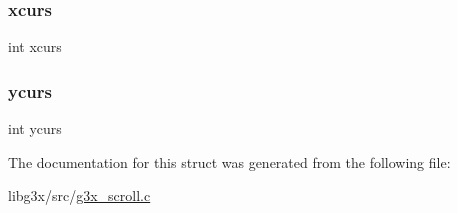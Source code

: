 \subsubsection{\texorpdfstring{xcurs}{xcurs}}
{\footnotesize\ttfamily int xcurs}

\mbox{\label{struct_g3_xscroll_a8a7bbcc9998fba42cea9ea3803cd99d4}} 
\subsubsection{\texorpdfstring{ycurs}{ycurs}}
{\footnotesize\ttfamily int ycurs}



The documentation for this struct was generated from the following file\+:\begin{DoxyCompactItemize}
\item 
libg3x/src/\hyperlink{g3x__scroll_8c}{g3x\+\_\+scroll.\+c}\end{DoxyCompactItemize}
